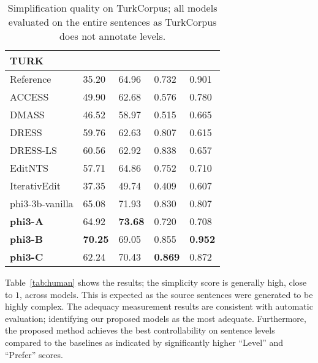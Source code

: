 \begin{table}[t!]
    \small
    \centering
   \begin{adjustbox}{width=1\linewidth}
    \begin{tabular}{l L L L L} \hline
     \textbf{TURK} &   &    &    &       \\ \hline
     Reference & 35.20 &  64.96 & 0.732 & 0.901 \\ \hline
       ACCESS  & 49.90 & 62.68 & 0.576 & 0.780 \\
       DMASS   & 46.52 & 58.97 & 0.515 & 0.665 \\
      DRESS  & 59.76 & 62.63& 0.807 & 0.615 \\
      DRESS-LS   &60.56 & 62.92 & 0.838 & 0.657 \\
        EditNTS   &57.71 & 64.86 & 0.752 & 0.710 \\
       IterativEdit   & 37.35 & 49.74 & 0.409 & 0.607 \\
      
     \hline
        phi3-3b-vanilla  & 65.08 & 71.93 & 0.830 & 0.807 \\
        \textbf{phi3-A} & 64.92 & \textbf{73.68} & 0.720 & 0.708 \\
        \textbf{phi3-B} & \textbf{70.25} & 69.05 & 0.855 & \textbf{0.952} \\
        \textbf{phi3-C} & 62.24 & 70.43 & \textbf{0.869} &0.872 \\
         \hline
    \end{tabular}
   \end{adjustbox}
    \caption{Simplification quality on TurkCorpus; all models evaluated on the entire sentences as TurkCorpus does not annotate levels.  }
    \label{tab:turk2}
\end{table}


Table~\ref{tab:human} shows the results; the simplicity score is generally high, close to $1$, across models. 
This is expected as the source sentences were generated to be highly complex. %
The adequacy measurement results are consistent with automatic evaluation; identifying our proposed models as the most adequate. 
Furthermore, the proposed method achieves the best controllability on sentence levels compared to the baselines as indicated by significantly higher ``Level'' and ``Prefer'' scores. 



